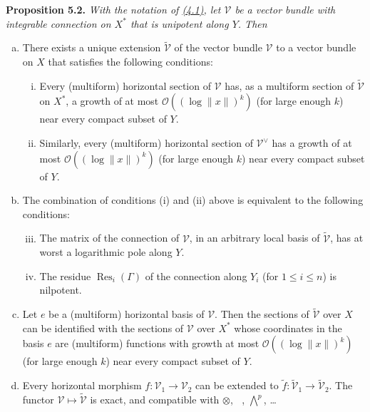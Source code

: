 \documentclass{report}
\newenvironment{itenv}[1]
  {\phantomsection\par\medskip\noindent\textbf{#1.}\itshape}
  {\par\medskip}
\renewcommand{\cal}[1]{{\mathcal{#1}}}
\newcommand{\order}{\mathcal{O}}
\renewcommand{\leq}{\leqslant}
\DeclareMathOperator{\shHom}{\underline{Hom}}
\DeclareMathOperator{\Res}{Res}
\newcommand{\oldpage}[1]{\marginpar{\footnotesize$\Big\vert$ \textit{p.~#1}}}
\begin{document}
\begin{itenv}{Proposition 5.2}
\label{II.5.2}
With the notation of \hyperref[II.4.1]{(4.1)}, let $\cal{V}$ be a vector bundle with integrable connection on $X^*$ that is unipotent along $Y$.
Then
\begin{enumerate}[(a)]
  \item There exists a unique extension $\widetilde{\cal{V}}$ of the vector bundle $\cal{V}$ to a vector bundle on $X$ that satisfies the following conditions:
\oldpage{92}
    \begin{enumerate}[(i)]
      \item Every (multiform) horizontal section of $\cal{V}$ has, as a multiform section of $\widetilde{\cal{V}}$ on $X^*$, a growth of at most $\order((\log\|x\|)^k)$ (for large enough $k$) near every compact subset of $Y$.
      \item Similarly, every (multiform) horizontal section of $\cal{V}^\vee$ has a growth of at most $\order((\log\|x\|)^k)$ (for large enough $k$) near every compact subset of $Y$.
    \end{enumerate}
  \item The combination of conditions (i) and (ii) above is equivalent to the following conditions:
    \begin{enumerate}[(i)]
      \setcounter{enumi}{2}
      \item The matrix of the connection of $\cal{V}$, in an arbitrary local basis of $\widetilde{\cal{V}}$, has at worst a logarithmic pole along $Y$.
      \item The residue $\Res_i(\Gamma)$ of the connection along $Y_i$ (for $1\leq i\leq n$) is nilpotent.
    \end{enumerate}
  \item Let $e$ be a (multiform) horizontal basis of $\cal{V}$.
    Then the sections of $\widetilde{\cal{V}}$ over $X$ can be identified with the sections of $\cal{V}$ over $X^*$ whose coordinates in the basis $e$ are (multiform) functions with growth at most $\order((\log\|x\|)^k)$ (for large enough $k$) near every compact subset of $Y$.
  \item Every horizontal morphism $f\colon\cal{V}_1\to\cal{V}_2$ can be extended to $\widetilde{f}\colon\widetilde{\cal{V}}_1\to\widetilde{\cal{V}}_2$.
    The functor $\cal{V}\mapsto\widetilde{\cal{V}}$ is exact, and compatible with $\otimes$, $\shHom$, $\bigwedge^p$, \ldots
\end{enumerate}
\end{itenv}
\end{document}
